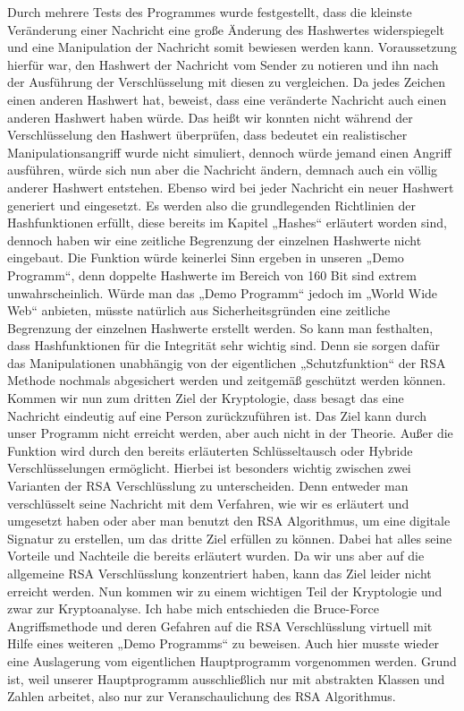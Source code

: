 Durch mehrere Tests des Programmes wurde festgestellt, dass die kleinste Veränderung einer Nachricht eine große Änderung des Hashwertes widerspiegelt und eine Manipulation der Nachricht somit bewiesen werden kann. Voraussetzung hierfür war, den Hashwert der Nachricht vom Sender zu notieren und ihn nach der Ausführung der Verschlüsselung mit diesen zu vergleichen. Da jedes Zeichen einen anderen Hashwert hat, beweist, dass eine veränderte Nachricht auch einen anderen Hashwert haben würde. Das heißt wir konnten nicht während der Verschlüsselung den Hashwert überprüfen, dass bedeutet ein realistischer Manipulationsangriff wurde nicht simuliert, dennoch würde jemand einen Angriff ausführen, würde sich nun aber die Nachricht ändern, demnach auch ein völlig anderer Hashwert entstehen. Ebenso wird bei jeder Nachricht ein neuer Hashwert generiert und eingesetzt. Es werden also die grundlegenden Richtlinien der Hashfunktionen erfüllt, diese bereits im Kapitel „Hashes“ erläutert worden sind, dennoch haben wir eine zeitliche Begrenzung der einzelnen Hashwerte nicht eingebaut. Die Funktion würde keinerlei Sinn ergeben in unseren „Demo Programm“, denn doppelte Hashwerte im Bereich von 160 Bit sind extrem unwahrscheinlich. Würde man das „Demo Programm“ jedoch im „World Wide Web“ anbieten, müsste natürlich aus Sicherheitsgründen eine zeitliche Begrenzung der einzelnen Hashwerte erstellt werden. So kann man festhalten, dass Hashfunktionen für die Integrität sehr wichtig sind. Denn sie sorgen dafür das Manipulationen unabhängig von der eigentlichen „Schutzfunktion“ der RSA Methode nochmals abgesichert werden und zeitgemäß geschützt werden können. Kommen wir nun zum dritten Ziel der Kryptologie, dass besagt das eine Nachricht eindeutig auf eine Person zurückzuführen ist. Das Ziel kann durch unser Programm nicht erreicht werden, aber auch nicht in der Theorie. Außer die Funktion wird durch den bereits erläuterten Schlüsseltausch oder Hybride Verschlüsselungen ermöglicht. Hierbei ist besonders wichtig zwischen zwei Varianten der RSA Verschlüsslung zu unterscheiden. Denn entweder man verschlüsselt seine Nachricht mit dem Verfahren, wie wir es erläutert und umgesetzt haben oder aber man benutzt den RSA Algorithmus, um eine digitale Signatur zu erstellen, um das dritte Ziel erfüllen zu können. Dabei hat alles seine Vorteile und Nachteile die bereits erläutert wurden. Da wir uns aber auf die allgemeine RSA Verschlüsslung konzentriert haben, kann das Ziel leider nicht erreicht werden. Nun kommen wir zu einem wichtigen Teil der Kryptologie und zwar zur Kryptoanalyse. Ich habe mich entschieden die Bruce-Force Angriffsmethode und deren Gefahren auf die RSA Verschlüsslung virtuell mit Hilfe eines weiteren „Demo Programms“ zu beweisen. Auch hier musste wieder eine Auslagerung vom eigentlichen Hauptprogramm vorgenommen werden. Grund ist, weil unserer Hauptprogramm ausschließlich nur mit abstrakten Klassen und Zahlen arbeitet, also nur zur Veranschaulichung des RSA Algorithmus. \\
